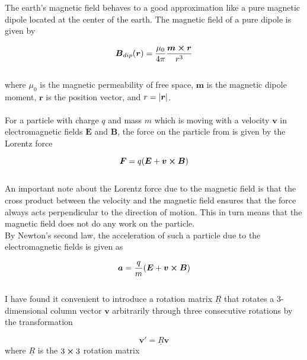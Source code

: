 The earth's magnetic field behaves to a good approximation like a pure magnetic dipole located at the center of the earth. The magnetic field of a pure dipole is given by

\begin{equation}
    \boldsymbol{B}_{dip}(\boldsymbol{r}) = \frac{\mu_0}{4\pi}\frac{\boldsymbol{m}\cross\boldsymbol{r}}{r^3}
\label{eq:dipoleField}
\end{equation}
\\
where $\mu_0$ is the magnetic permeability of free space, $\boldsymbol{m}$ is the magnetic dipole moment, $\boldsymbol{r}$ is the position vector, and $r = \abs{\boldsymbol{r}}$.\\
\\
For a particle with charge $q$ and mass $m$ which is moving with a velocity $\boldsymbol{v}$ in electromagnetic fields $\boldsymbol{E}$ and $\boldsymbol{B}$, the force on the particle from is given by the Lorentz force

\begin{equation}
    \boldsymbol{F}=q(\boldsymbol{E}+\boldsymbol{v} \cross\boldsymbol{B})
\label{eq:LorentzForce}
\end{equation}
\\
An important note about the Lorentz force due to the magnetic field is that the cross product between the velocity and the magnetic field ensures that the force always acts perpendicular to the direction of motion. This in turn means that the magnetic field does not do any work on the particle.\\

By Newton's second law, the acceleration of such a particle due to the electromagnetic fields is given as

\begin{equation}
    \boldsymbol{a}=\frac{q}{m}(\boldsymbol{E}+\boldsymbol{v} \cross\boldsymbol{B})
\label{eq:acceleration}
\end{equation}
\\
I have found it convenient to introduce a rotation matrix $\underline{R}$ that rotates a 3-dimensional column vector $\boldsymbol{v}$ arbitrarily through three consecutive rotations by the transformation

\begin{equation}
    \boldsymbol{v}' = \underline{R}\boldsymbol{v}
\label{eq:Rotation}
\end{equation}
where $\underline{R}$ is the $3\cross3$ rotation matrix

